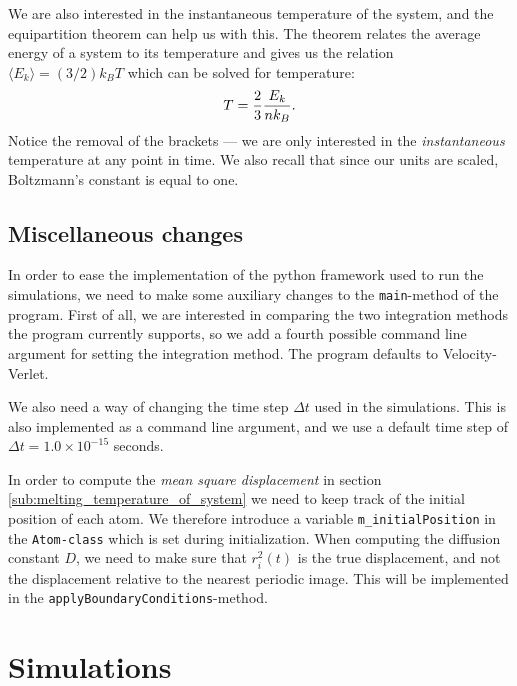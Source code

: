 \documentclass[a4paper]{article}
\begin{document}
    We are also interested in the instantaneous temperature of the system, and
    the equipartition theorem \cite{equipar} can help us with this. The theorem
    relates the average energy of a system to its temperature and gives us the
    relation $\langle E_k \rangle = (3/2)k_BT$ which can be solved for
    temperature:
    \begin{equation}
        \notag
        T = \frac{2}{3} \frac{E_k}{nk_B}.
    \end{equation}
    Notice the removal of the brackets --- we are only interested in the
    \emph{instantaneous} temperature at any point in time. We also recall that
    since our units are scaled, Boltzmann's constant is equal to one.
    
    \subsection{Miscellaneous changes}
    \label{sub:miscellaneous_changes}
    
    In order to ease the implementation of the python framework used to run the
    simulations, we need to make some auxiliary changes to the
    \texttt{main}-method of the program. First of all, we are interested in
    comparing the two integration methods the program currently supports, so we
    add a fourth possible command line argument for setting the integration
    method. The program defaults to Velocity-Verlet.  
    
    We also need a way of changing the time step $\Delta t$ used in the
    simulations. This is also implemented as a command line argument, and we
    use a default time step of $\Delta t = 1.0 \times 10^{-15}$ seconds.
    
    In order to compute the \emph{mean square displacement} in section
    \ref{sub:melting_temperature_of_system} we need to keep track of the
    initial position of each atom. We therefore introduce a variable
    \texttt{m\_initialPosition} in the \texttt{Atom-class} which is set during
    initialization.  When computing the diffusion constant $D$, we need to make
    sure that $r_i^2(t)$ is the true displacement, and not the displacement
    relative to the nearest periodic image. This will be implemented in the
    \texttt{applyBoundaryConditions}-method.

\section{Simulations}
\label{sec:simulations}
\end{document}
